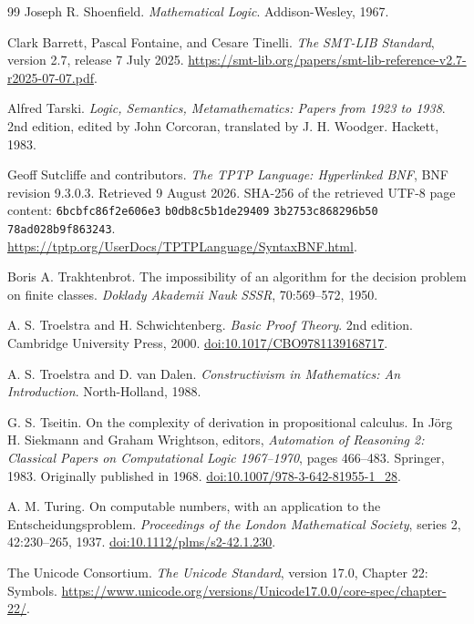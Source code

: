 \documentclass[11pt,oneside,openany]{book}
\theoremstyle{definition}
\theoremstyle{plain}
\theoremstyle{remark}
\begin{document}
\begin{thebibliography}{99}
Joseph R. Shoenfield.
\emph{Mathematical Logic}.
Addison-Wesley, 1967.

Clark Barrett, Pascal Fontaine, and Cesare Tinelli.
\emph{The SMT-LIB Standard}, version 2.7, release 7 July 2025.
\url{https://smt-lib.org/papers/smt-lib-reference-v2.7-r2025-07-07.pdf}.

Alfred Tarski.
\emph{Logic, Semantics, Metamathematics: Papers from 1923 to 1938}.
2nd edition, edited by John Corcoran, translated by J. H. Woodger.
Hackett, 1983.

Geoff Sutcliffe and contributors.
\emph{The TPTP Language: Hyperlinked BNF}, BNF revision 9.3.0.3.
Retrieved 9 August 2026.
SHA-256 of the retrieved UTF-8 page content:
\texttt{6bcbfc86f2e606e3}\allowbreak
\texttt{b0db8c5b1de29409}\allowbreak
\texttt{3b2753c868296b50}\allowbreak
\texttt{78ad028b9f863243}.
\url{https://tptp.org/UserDocs/TPTPLanguage/SyntaxBNF.html}.

Boris A. Trakhtenbrot.
The impossibility of an algorithm for the decision problem on finite classes.
\emph{Doklady Akademii Nauk SSSR}, 70:569--572, 1950.

A. S. Troelstra and H. Schwichtenberg.
\emph{Basic Proof Theory}. 2nd edition.
Cambridge University Press, 2000.
\href{https://doi.org/10.1017/CBO9781139168717}{doi:10.1017/CBO9781139168717}.

A. S. Troelstra and D. van Dalen.
\emph{Constructivism in Mathematics: An Introduction}.
North-Holland, 1988.

G. S. Tseitin.
On the complexity of derivation in propositional calculus.
In J\"org H. Siekmann and Graham Wrightson, editors,
\emph{Automation of Reasoning 2: Classical Papers on Computational Logic
1967--1970}, pages 466--483.  Springer, 1983.  Originally published in 1968.
\href{https://doi.org/10.1007/978-3-642-81955-1_28}{doi:10.1007/978-3-642-81955-1\_28}.

A. M. Turing.
On computable numbers, with an application to the Entscheidungsproblem.
\emph{Proceedings of the London Mathematical Society}, series 2, 42:230--265,
1937.
\href{https://doi.org/10.1112/plms/s2-42.1.230}{doi:10.1112/plms/s2-42.1.230}.

The Unicode Consortium.
\emph{The Unicode Standard}, version 17.0, Chapter 22: Symbols.
\url{https://www.unicode.org/versions/Unicode17.0.0/core-spec/chapter-22/}.

\end{thebibliography}

\cleardoublepage
{}
{}
\begingroup
\sloppy
\printindex
\endgroup
\end{document}

